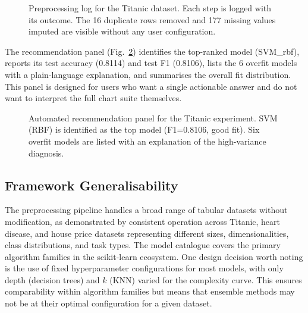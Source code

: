 \documentclass[conference]{IEEEtran}
\begin{document}
\begin{figure}[t]
    \centering
    \caption{Preprocessing log for the Titanic dataset. Each step is logged with its outcome. The 16 duplicate rows removed and 177 missing values imputed are visible without any user configuration.}
    \label{fig:preplog}
\end{figure}

The recommendation panel (Fig.~\ref{fig:recommend}) identifies the top-ranked model (SVM\_rbf), reports its test accuracy (0.8114) and test F1 (0.8106), lists the 6 overfit models with a plain-language explanation, and summarises the overall fit distribution. This panel is designed for users who want a single actionable answer and do not want to interpret the full chart suite themselves.

\begin{figure}[t]
    \centering
    \caption{Automated recommendation panel for the Titanic experiment. SVM (RBF) is identified as the top model (F1=0.8106, good fit). Six overfit models are listed with an explanation of the high-variance diagnosis.}
    \label{fig:recommend}
\end{figure}

\subsection{Framework Generalisability}

The preprocessing pipeline handles a broad range of tabular datasets without modification, as demonstrated by consistent operation across Titanic, heart disease, and house price datasets representing different sizes, dimensionalities, class distributions, and task types. The model catalogue covers the primary algorithm families in the scikit-learn ecosystem. One design decision worth noting is the use of fixed hyperparameter configurations for most models, with only depth (decision trees) and $k$ (KNN) varied for the complexity curve. This ensures comparability within algorithm families but means that ensemble methods may not be at their optimal configuration for a given dataset.
\end{document}
